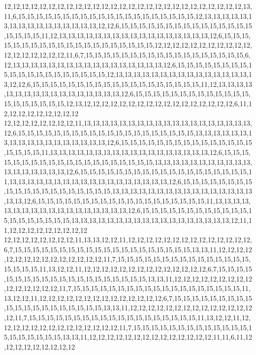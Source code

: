 12,12,12,12,12,12,12,12,12,12,12,12,12,12,12,12,12,12,12,12,12,12,12,12,12,12,12,13,11,6,15,15,15,15,15,15,15,15,15,15,15,15,15,15,15,15,15,15,15,15,12,13,13,13,13,13,13,13,13,13,13,13,13,13,13,13,13,12,12,6,15,15,15,15,15,15,15,15,15,15,15,15,15,15,15,15,15,15,15,11,12,13,13,13,13,13,13,13,13,13,13,13,13,13,13,13,13,13,12,6,15,15,15,15,15,15,15,15,15,15,15,15,15,15,15,15,15,15,15,15,12,12,12,12,12,12,12,12,12,12,12,12,12,12,12,12,12,12,11,6,7,15,15,15,15,15,15,15,15,15,15,15,15,15,15,15,15,15,15,6,12,13,13,13,13,13,13,13,13,13,13,13,13,13,13,13,13,13,12,6,15,15,15,15,15,15,15,15,15,15,15,15,15,15,15,15,15,15,15,15,12,13,13,13,13,13,13,13,13,13,13,13,13,13,13,13,13,12,12,6,15,15,15,15,15,15,15,15,15,15,15,15,15,15,15,15,15,15,15,11,12,13,13,13,13,13,13,13,13,13,13,13,13,13,13,13,13,13,12,6,15,15,15,15,15,15,15,15,15,15,15,15,15,15,15,15,15,15,15,15,12,13,12,12,12,12,12,12,12,12,12,12,12,12,12,12,12,12,12,6,11,12,12,12,12,12,12,12,12,12
12,12,12,12,12,12,12,12,11,13,13,13,13,13,13,13,13,13,13,13,13,13,13,13,13,13,13,13,12,6,15,15,15,15,15,15,15,15,15,15,15,15,15,15,15,15,15,15,15,15,13,13,13,13,13,13,13,13,13,13,13,13,13,13,13,13,13,13,12,6,15,15,15,15,15,15,15,15,15,15,15,15,15,15,15,15,15,15,15,11,13,13,13,13,13,13,13,13,13,13,13,13,13,13,13,13,13,13,12,6,15,15,15,15,15,15,15,15,15,15,15,15,15,15,15,15,15,15,15,15,13,13,13,13,13,13,13,13,13,13,13,13,13,13,13,13,13,13,12,6,15,15,15,15,15,15,15,15,15,15,15,15,15,15,15,15,15,15,15,11,13,13,13,13,13,13,13,13,13,13,13,13,13,13,13,13,13,13,12,6,15,15,15,15,15,15,15,15,15,15,15,15,15,15,15,15,15,15,15,15,13,13,13,13,13,13,13,13,13,13,13,13,13,13,13,13,13,13,12,6,15,15,15,15,15,15,15,15,15,15,15,15,15,15,15,15,15,15,15,11,13,13,13,13,13,13,13,13,13,13,13,13,13,13,13,13,13,13,12,6,15,15,15,15,15,15,15,15,15,15,15,15,15,15,15,15,15,15,15,15,13,13,13,13,13,13,13,13,13,13,13,13,13,13,13,13,13,13,12,11,11,12,12,12,12,12,12,12,12,12
12,12,12,12,12,12,12,12,11,13,13,12,12,11,12,12,12,12,12,12,12,12,12,12,12,12,12,12,6,7,15,15,15,15,15,15,15,15,15,15,15,15,15,15,15,15,15,15,15,15,13,13,11,12,12,12,12,12,12,12,12,12,12,12,12,12,12,12,11,7,15,15,15,15,15,15,15,15,15,15,15,15,15,15,15,15,15,15,15,11,13,12,12,11,12,12,12,12,12,12,12,12,12,12,12,12,12,12,6,7,15,15,15,15,15,15,15,15,15,15,15,15,15,15,15,15,15,15,15,15,13,13,11,12,12,12,12,12,12,12,12,12,12,12,12,12,12,12,11,7,15,15,15,15,15,15,15,15,15,15,15,15,15,15,15,15,15,15,15,11,13,12,12,11,12,12,12,12,12,12,12,12,12,12,12,12,12,12,6,7,15,15,15,15,15,15,15,15,15,15,15,15,15,15,15,15,15,15,15,15,13,13,11,12,12,12,12,12,12,12,12,12,12,12,12,12,12,12,11,7,15,15,15,15,15,15,15,15,15,15,15,15,15,15,15,15,15,15,15,11,13,12,12,11,12,12,12,12,12,12,12,12,12,12,12,12,12,12,11,7,15,15,15,15,15,15,15,15,15,15,15,15,15,15,15,15,15,15,15,15,13,13,11,12,12,12,12,12,12,12,12,12,12,12,12,12,12,11,11,6,11,12,12,12,12,12,12,12,12,12
